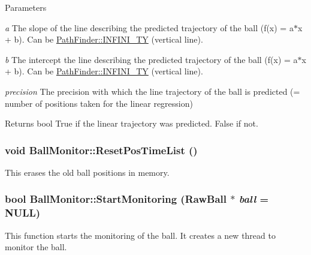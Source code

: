 \begin{DoxyParams}{Parameters}
\item[{\em a}]The slope of the line describing the predicted trajectory of the ball (f(x) = a$\ast$x + b). Can be \hyperlink{classPathFinder_a341ee3901465d58e8aad2fc0dd227168}{PathFinder::INFINI\_\-TY} (vertical line). \item[{\em b}]The intercept the line describing the predicted trajectory of the ball (f(x) = a$\ast$x + b). Can be \hyperlink{classPathFinder_a341ee3901465d58e8aad2fc0dd227168}{PathFinder::INFINI\_\-TY} (vertical line). \item[{\em precision}]The precision with which the line trajectory of the ball is predicted (= number of positions taken for the linear regression) \end{DoxyParams}
\begin{DoxyReturn}{Returns}
bool True if the linear trajectory was predicted. False if not. 
\end{DoxyReturn}
\hypertarget{classBallMonitor_a09ed61cf1852d45f03e7aacdebfe0175}{
\subsubsection[{ResetPosTimeList}]{\setlength{\rightskip}{0pt plus 5cm}void BallMonitor::ResetPosTimeList ()}}
\label{classBallMonitor_a09ed61cf1852d45f03e7aacdebfe0175}


This erases the old ball positions in memory. 

\hypertarget{classBallMonitor_a4d2b3aa764f5d4f4d5f58b7530565f90}{
\subsubsection[{StartMonitoring}]{\setlength{\rightskip}{0pt plus 5cm}bool BallMonitor::StartMonitoring (RawBall $\ast$ {\em ball} = {\ttfamily NULL})}}
\label{classBallMonitor_a4d2b3aa764f5d4f4d5f58b7530565f90}


This function starts the monitoring of the ball. It creates a new thread to monitor the ball. 


